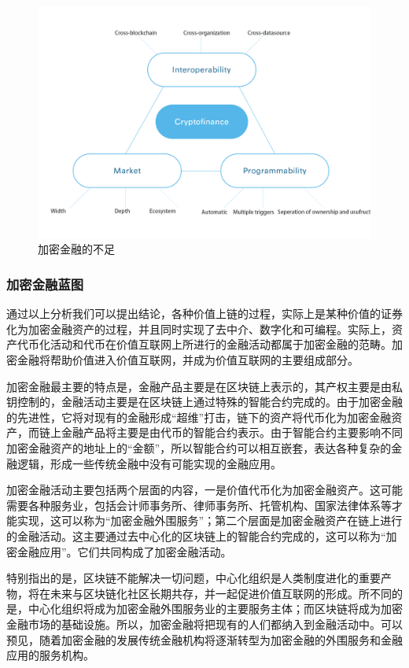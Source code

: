\documentclass[a4paper,12pt]{article}
\begin{document}
\begin{figure} [htbp]
\centering \includegraphics [width = 5in]{pic_cn/Characteristics-of-Cryptofinance.png}
\caption{加密金融的不足} \label{fig:Characteristics-of-Cryptofinance}
\end{figure}

\subsubsection{加密金融蓝图}

通过以上分析我们可以提出结论，各种价值上链的过程，实际上是某种价值的证券化为加密金融资产的过程，并且同时实现了去中介、数字化和可编程。实际上，资产代币化活动和代币在价值互联网上所进行的金融活动都属于加密金融的范畴。加密金融将帮助价值进入价值互联网，并成为价值互联网的主要组成部分。

加密金融最主要的特点是，金融产品主要是在区块链上表示的，其产权主要是由私钥控制的，金融活动主要是在区块链上通过特殊的智能合约完成的。由于加密金融的先进性，它将对现有的金融形成“超维”打击，链下的资产将代币化为加密金融资产，而链上金融产品将主要是由代币的智能合约表示。由于智能合约主要影响不同加密金融资产的地址上的“金额”，所以智能合约可以相互嵌套，表达各种复杂的金融逻辑，形成一些传统金融中没有可能实现的金融应用。

加密金融活动主要包括两个层面的内容，一是价值代币化为加密金融资产。这可能需要各种服务业，包括会计师事务所、律师事务所、托管机构、国家法律体系等才能实现，这可以称为“加密金融外围服务”；第二个层面是加密金融资产在链上进行的金融活动。这主要通过去中心化的区块链上的智能合约完成的，这可以称为“加密金融应用”。它们共同构成了加密金融活动。

特别指出的是，区块链不能解决一切问题，中心化组织是人类制度进化的重要产物，将在未来与区块链化社区长期共存，并一起促进价值互联网的形成。所不同的是，中心化组织将成为加密金融外围服务业的主要服务主体；而区块链将成为加密金融市场的基础设施。所以，加密金融将把现有的人们都纳入到金融活动中。可以预见，随着加密金融的发展传统金融机构将逐渐转型为加密金融的外围服务和金融应用的服务机构。
\end{document}
